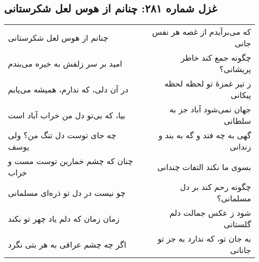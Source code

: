 \begin{center}
\section*{غزل شماره ۲۸۱: چنانم از هوس لعل شکرستانی}
\label{sec:281}
\begin{longtable}{l p{0.5cm} r}
چنانم از هوس لعل شکرستانی
&&
که می‌برآیدم از غصه هر نفس جانی
\\
امید بر سر زلفش به خیره می‌بندم
&&
چگونه جمع کند خاطر پریشانی؟
\\
در آن دلی، که ندارم، همیشه می‌یابم
&&
ز تیر غمزهٔ تو لحظه لحظه پیکانی
\\
بیا، که بی‌تو دل من خراب آباد است
&&
جهان نمی‌شود آباد جز به سلطانی
\\
چه جای توست دل تنگ من؟ ولی یوسف
&&
گهی به چه فتد و گه به بند و زندانی
\\
چنان که چشم خمارین توست مست و خراب
&&
بسوی ما نکند التفات چندانی
\\
چو نیست در دل تو ذره‌ای مسلمانی
&&
چگونه رحم کند بر دل مسلمانی؟
\\
زمان زمان که دلم یاد چهر تو بکند
&&
شود ز عکس جمالت دلم گلستانی
\\
اگر چه چشم عراقی به هر بتی نگرد
&&
به جان تو، که ندارد به جز تو جانانی
\\
\end{longtable}
\end{center}
